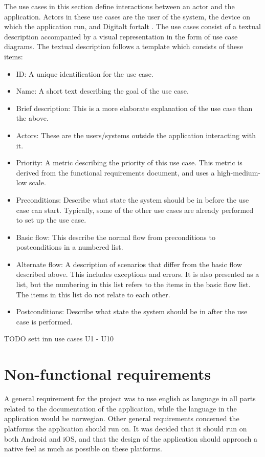 The use cases in this section define interactions between an actor and the application. Actors in these use cases are the user of the system, the device on which the application run, and Digitalt fortalt . The use cases consist of a textual description accompanied by a visual representation in the form of use case diagrams. The textual description follows a template which consists of these items:
\begin{itemize}
\item ID: A unique identification for the use case.
\item Name: A short text describing the goal of the use case.
\item Brief description: This is a more elaborate explanation of the use case than the above.
\item Actors: These are the users/systems outside the application interacting with it.
\item Priority: A metric describing the priority of this use case. This metric is derived from the functional requirements document, and uses a high-medium-low scale.
\item Preconditions: Describe what state the system should be in before the use case can start. Typically, some of the other use cases are already performed to set up the use case.
\item Basic flow: This describe the normal flow from preconditions to postconditions in a numbered list.
\item Alternate flow: A description of scenarios that differ from the basic flow described above. This includes exceptions and errors. It is also presented as a list, but the numbering in this list refers to the items in the basic flow list. The items in this list do not relate to each other.
\item Postconditions: Describe what state the system should be in after the use case is performed.
\end{itemize}

TODO sett inn use cases U1 - U10\newline

\section{Non-functional requirements}
\label{sec_non-functional_requirements}

A general requirement for the project was to use english as language in all parts related to the documentation of the application, while the language in the application would be norwegian. Other general requirements concerned the platforms the application should run on. It was decided that it should run on both Android and iOS, and that the design of the application should approach a native feel as much as possible on these platforms.\newline

